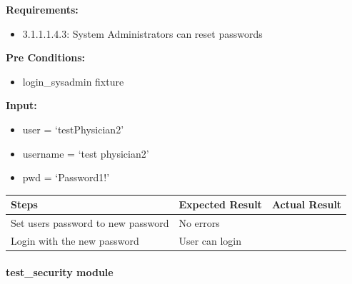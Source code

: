 \documentclass[letterpaper,10pt,english]{sphinxmanual}
\begin{document}
\begin{fulllineitems}
\label{STD/test_password:test_password.test_reset_password}
\textbf{Requirements:}
\begin{itemize}
\item {} 
3.1.1.1.4.3: System Administrators can reset passwords

\end{itemize}

\textbf{Pre Conditions:}
\begin{itemize}
\item {} 
login\_sysadmin fixture

\end{itemize}

\textbf{Input:}
\begin{itemize}
\item {} 
user = `testPhysician2'

\item {} 
username = `test physician2'

\item {} 
pwd = `Password1!'

\end{itemize}

\begin{tabulary}{\linewidth}{|L|L|L|}
\hline
\textsf{\relax 
Steps
} & \textsf{\relax 
Expected Result
} & \textsf{\relax 
Actual Result
}\\
\hline
Set users password to new password
 & 
No errors
 & \\
\hline
Login with the new password
 & 
User can login
 & \\
\hline\end{tabulary}


\end{fulllineitems}



\paragraph{test\_security module}
\label{STD/test_security:test-security-module}\label{STD/test_security:module-test_security}\label{STD/test_security::doc}
\end{document}

